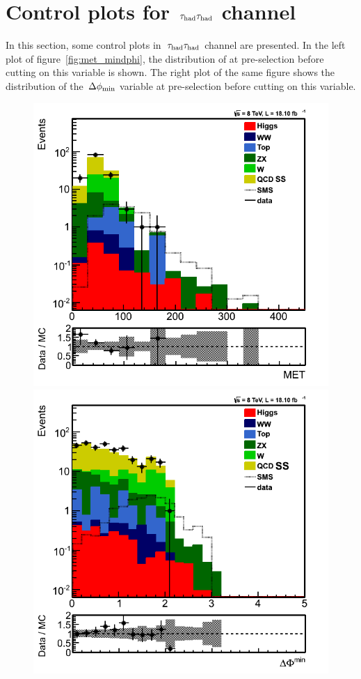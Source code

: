 \section{\texorpdfstring{Control plots for $\,\tau_{\rm had}\tau_{\rm had}$ channel}{Control plots for tau-tau channel}}
In this section, some control plots in $\,\tau_{\rm had}\tau_{\rm had}$ channel are presented. In the left plot of figure~\ref{fig:met_mindphi}, the distribution of \MET at pre-selection before cutting on this variable is shown. The right plot of the same figure shows the distribution of the $\,{\Delta\phi_{\rm min}}$ variable at pre-selection before cutting on this variable.
\begin{figure}[!Hhtb]
\centering
\includegraphics[angle=0,scale=0.35]{TauTauFigs/MET2.png}
\includegraphics[angle=0,scale=0.35]{TauTauFigs/DPhimin.png} \\

\end{figure}

